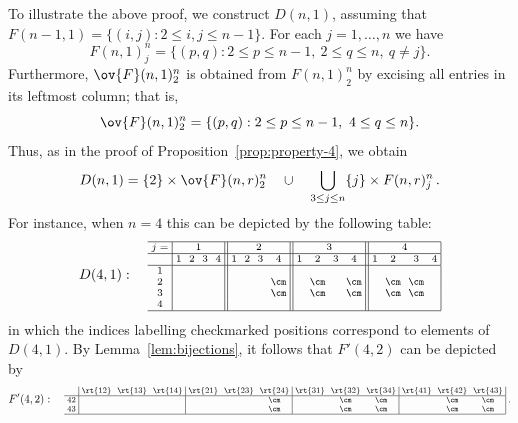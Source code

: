 \begin{exam}\label{Dn1}
To illustrate the above proof, we construct $D(n,1)$, assuming that
$F(n-1,1) = \{(i,j): 2 \le i,j \le n-1\}$. For each $j=1, \dots,
n$ we have
\[
F(n,1)^n_j = \{ (p,q): 2 \le p \le n-1,\ 2 \le q \le n,\ q \ne j\}.
\]
Furthermore, $\ov{F}(n,1)^n_2$ is obtained from $F(n,1)^n_2$ by
excising all entries in its leftmost column; that is,
\[
\ov{F}(n,1)^n_2 = \{ (p,q): 2 \le p \le n-1,\ 4 \le q \le n\}.
\]
Thus, as in the proof of Proposition~\ref{prop:property-4}, we obtain
\[
D(n,1) = \{2\}\times \ov{F}(n,r)^n_2 \quad\cup\quad \bigcup_{3\leq j
 \leq n}\{j\}\times F(n,r)^n_j \, .
\]
For instance, when $n=4$ this can be depicted by the following table:
\[ D(4,1): \quad
\text{\setlength{\arraycolsep}{2.7pt}\scriptsize
$\displaystyle 
\begin{array}{c|cccc||cccc||cccc||cccc|}
\hline
j=&\multicolumn{4}{c||}{1}	
&\multicolumn{4}{c||}{2}
&\multicolumn{4}{c||}{3}
&\multicolumn{4}{c|}{4}					\\ \hline
 &1&2&3&4 &1&2&3&4 &1&2&3&4 &1&2&3&4 \\ \hline
 1 &&&& &&&& &&&& &&&&\\
 2 &&&& &&&&\cm && \cm&&\cm && \cm&\cm&\\
 3 &&&& &&&&\cm && \cm&&\cm && \cm&\cm&\\ 
 4 &&&& &&&& &&&& &&&&\\ 
 \hline
\end{array}$}
\]
in which the indices labelling checkmarked positions correspond to
elements of $D(4,1)$. By Lemma~\ref{lem:bijections}, it follows that
$F'(4,2)$ can be depicted by
\[
F'(4,2): \quad
\text{\setlength{\arraycolsep}{2.7pt}\scriptsize
$\displaystyle 
\begin{array}{c|ccc|ccc|ccc|ccc|}
 &\rt{12}&\rt{13}&\rt{14}&\rt{21} &\rt{23}&\rt{24}&\rt{31}&\rt{32}
 &\rt{34}&\rt{41}&\rt{42}&\rt{43} \\ \hline
 42 &&&	&&&\cm	&&\cm&\cm	&&\cm&\cm\\ 
 43 &&&	&&&\cm	&&\cm&\cm	&&\cm&\cm\\ 
 \hline
\end{array}\; .$}
\]
\end{exam}


